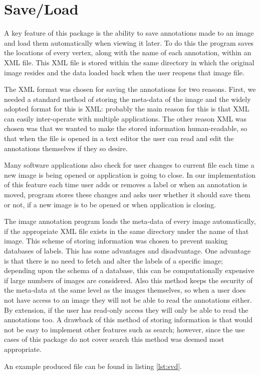 \section{Save\slash Load}
A key feature of this package is the ability to save annotations made to an image and load them automatically when viewing it later. To do this the program saves the locations of every vertex, along with the name of each annotation, within an XML file.  This XML file is stored within the same directory in which the original image resides and the data loaded back when the user reopens that image file.

The XML format was chosen for saving the annotations for two reasons. First, we needed a standard method of storing the meta-data of the image and the widely adopted format for this is XML: probably the main reason for this is that XML can easily inter-operate with multiple applications.  The other reason XML was chosen was that we wanted to make the stored information human-readable, so that when the file is opened in a text editor the user can read and edit the annotations themselves if they so desire.

Many software applications also check for user changes to current file each time a new image is being opened or application is going to close. In our implementation of this feature each time user adds or removes a label or when an annotation is moved, program stores these changes and asks user whether it should save them or not, if a new image is to be opened or when application is closing.

The image annotation program loads the meta-data of every image automatically, if the appropriate XML file exists in the same directory under the name of that image. This scheme of storing information was chosen to prevent making databases of labels. This has some advantages and  disadvantage. One advantage is that there is no need to fetch and alter the labels of a specific image; depending upon the schema of a database, this can be computationally expensive if large numbers of images are considered. Also this method keeps the security of the meta-data at the same level as the images themselves, so when a user does not have access to an image they will not be able to read the annotations either.  By extension, if the user has read-only access they will only be able to read the annotations too. A drawback of this method of storing information is that would not be easy to implement other features such as search; however, since the use cases of this package do not cover search this method was deemed most appropriate.

An example produced file can be found in listing \ref{lst:svd}.    

\begin{center}
\lstset{language=XML, basicstyle=\footnotesize\ttfamily, caption=XML file used to store image labels,frame=single,captionpos=b,label=lst:svd}

\end{center}